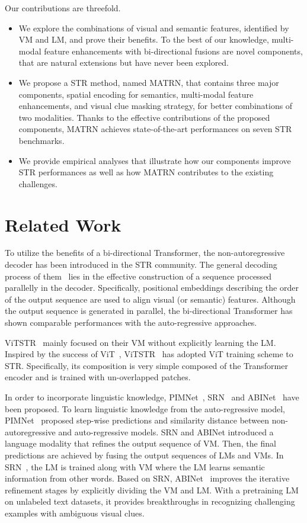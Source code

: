 \documentclass[runningheads]{llncs}
\begin{document}
Our contributions are threefold.
\begin{itemize}
    \item We explore the combinations of visual and semantic features, identified by VM and LM, and prove their benefits. To the best of our knowledge, multi-modal feature enhancements with bi-directional fusions are novel components, that are natural extensions but have never been explored. 
    \item We propose a STR method, named MATRN, that contains three major components, spatial encoding for semantics, multi-modal feature enhancements, and visual clue masking strategy, for better combinations of two modalities. Thanks to the effective contributions of the proposed components, MATRN achieves state-of-the-art performances on seven STR benchmarks. 
    \item We provide empirical analyses that illustrate how our components improve STR performances as well as how MATRN contributes to the existing challenges.
\end{itemize}

\section{Related Work}

To utilize the benefits of a bi-directional Transformer, the non-autoregressive decoder has been introduced in the STR community. The general decoding process of them~\cite{ViTSTR,ABINet,PIMNet,VisionLAN,Yu_2020_CVPR_SRN} lies in the effective construction of a sequence processed parallelly in the decoder. Specifically, positional embeddings describing the order of the output sequence are used to align visual (or semantic) features. Although the output sequence is generated in parallel, the bi-directional Transformer has shown comparable performances with the auto-regressive approaches.

ViTSTR~\cite{ViTSTR} mainly focused on their VM without explicitly learning the LM. Inspired by the success of ViT~\cite{ViT}, ViTSTR~\cite{ViTSTR} has adopted ViT training scheme to STR. Specifically, its composition is very simple composed of the Transformer encoder and is trained with un-overlapped patches. 

In order to incorporate linguistic knowledge, PIMNet~\cite{PIMNet}, SRN~\cite{Yu_2020_CVPR_SRN} and ABINet~\cite{ABINet} have been proposed. To learn linguistic knowledge from the auto-regressive model, PIMNet~\cite{PIMNet} proposed step-wise predictions and similarity distance between non-autoregressive and auto-regressive models. SRN and ABINet introduced a language modality that refines the output sequence of VM. Then, the final predictions are achieved by fusing the output sequences of LMs and VMs. In SRN~\cite{Yu_2020_CVPR_SRN}, the LM is trained along with VM where the LM learns semantic information from other words. Based on SRN, ABINet~\cite{ABINet} improves the iterative refinement stages by explicitly dividing the VM and LM. With a pretraining LM on unlabeled text datasets, it provides breakthroughs in recognizing challenging examples with ambiguous visual clues.
\end{document}
